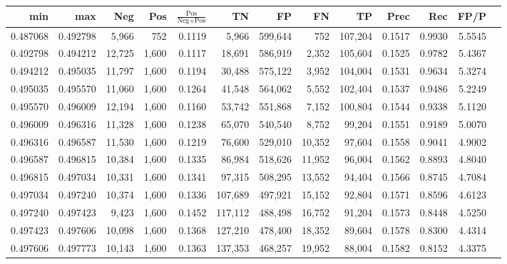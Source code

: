 \begin{tabular}{rrrrrrrrrrrrr}
\toprule
     min &      max &    Neg &   Pos & $\frac{\text{Pos}}{\text{Neg}+\text{Pos}}$ &      TN &      FP &      FN &      TP &   Prec &    Rec &   FP/P \\
\midrule
0.487068 & 0.492798 &  5,966 &   752 &                                     0.1119 &   5,966 & 599,644 &     752 & 107,204 & 0.1517 & 0.9930 & 5.5545 \\
0.492798 & 0.494212 & 12,725 & 1,600 &                                     0.1117 &  18,691 & 586,919 &   2,352 & 105,604 & 0.1525 & 0.9782 & 5.4367 \\
0.494212 & 0.495035 & 11,797 & 1,600 &                                     0.1194 &  30,488 & 575,122 &   3,952 & 104,004 & 0.1531 & 0.9634 & 5.3274 \\
0.495035 & 0.495570 & 11,060 & 1,600 &                                     0.1264 &  41,548 & 564,062 &   5,552 & 102,404 & 0.1537 & 0.9486 & 5.2249 \\
0.495570 & 0.496009 & 12,194 & 1,600 &                                     0.1160 &  53,742 & 551,868 &   7,152 & 100,804 & 0.1544 & 0.9338 & 5.1120 \\
0.496009 & 0.496316 & 11,328 & 1,600 &                                     0.1238 &  65,070 & 540,540 &   8,752 &  99,204 & 0.1551 & 0.9189 & 5.0070 \\
0.496316 & 0.496587 & 11,530 & 1,600 &                                     0.1219 &  76,600 & 529,010 &  10,352 &  97,604 & 0.1558 & 0.9041 & 4.9002 \\
0.496587 & 0.496815 & 10,384 & 1,600 &                                     0.1335 &  86,984 & 518,626 &  11,952 &  96,004 & 0.1562 & 0.8893 & 4.8040 \\
0.496815 & 0.497034 & 10,331 & 1,600 &                                     0.1341 &  97,315 & 508,295 &  13,552 &  94,404 & 0.1566 & 0.8745 & 4.7084 \\
0.497034 & 0.497240 & 10,374 & 1,600 &                                     0.1336 & 107,689 & 497,921 &  15,152 &  92,804 & 0.1571 & 0.8596 & 4.6123 \\
0.497240 & 0.497423 &  9,423 & 1,600 &                                     0.1452 & 117,112 & 488,498 &  16,752 &  91,204 & 0.1573 & 0.8448 & 4.5250 \\
0.497423 & 0.497606 & 10,098 & 1,600 &                                     0.1368 & 127,210 & 478,400 &  18,352 &  89,604 & 0.1578 & 0.8300 & 4.4314 \\
0.497606 & 0.497773 & 10,143 & 1,600 &                                     0.1363 & 137,353 & 468,257 &  19,952 &  88,004 & 0.1582 & 0.8152 & 4.3375 \\

\end{tabular}
